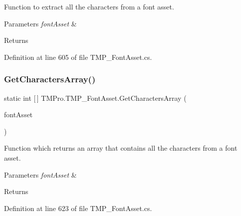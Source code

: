 Function to extract all the characters from a font asset. 


\begin{DoxyParams}{Parameters}
{\em font\+Asset} & \\
\hline
\end{DoxyParams}
\begin{DoxyReturn}{Returns}

\end{DoxyReturn}


Definition at line 605 of file T\+M\+P\+\_\+\+Font\+Asset.\+cs.

\mbox{\label{class_t_m_pro_1_1_t_m_p___font_asset_a04f042c328bf55d9d675184132319112}} 
\subsubsection{\texorpdfstring{GetCharactersArray()}{GetCharactersArray()}}
{\footnotesize\ttfamily static int \mbox{[}$\,$\mbox{]} T\+M\+Pro.\+T\+M\+P\+\_\+\+Font\+Asset.\+Get\+Characters\+Array (\begin{DoxyParamCaption}\item[{\mbox{\hyperlink{class_t_m_pro_1_1_t_m_p___font_asset}{T\+M\+P\+\_\+\+Font\+Asset}}}]{font\+Asset }\end{DoxyParamCaption})\hspace{0.3cm}{\ttfamily [static]}}



Function which returns an array that contains all the characters from a font asset. 


\begin{DoxyParams}{Parameters}
{\em font\+Asset} & \\
\hline
\end{DoxyParams}
\begin{DoxyReturn}{Returns}

\end{DoxyReturn}


Definition at line 623 of file T\+M\+P\+\_\+\+Font\+Asset.\+cs.

\mbox{\label{class_t_m_pro_1_1_t_m_p___font_asset_a10751e4fd6f455aa72ae50f688d0698a}} 
